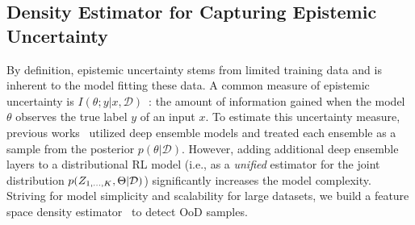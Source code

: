 \documentclass{article}
\newcommand{\datapoint}{x}
\newcommand{\state}{s}
\newcommand{\action}{a}
\newcommand{\agentIndex}{k}
\newcommand{\dataset}{\mathcal{D}}
\begin{document}



\vspace{-0.05in}
\subsection{Density Estimator for Capturing Epistemic Uncertainty}\label{subsec:epistemic-uncertainty}
\vspace{-0.05in}
By definition, epistemic uncertainty stems from limited training data and is inherent to the model fitting these data. A common measure of epistemic uncertainty is $I(\theta; y|\datapoint,\dataset)$~\cite{Smith2018Uncertainty,Amersfoort2020Uncertainty,Mukhoti2021Uncertainty}: the amount of information gained when the model $\theta$ observes the true label $y$ of an input $\datapoint$.
To estimate this uncertainty measure, previous works~\cite{Lakshminarayanan2017Ensembles,Wen2020BatchEnsemble,Dusenberry2020Bayesian} utilized deep ensemble models and treated each ensemble as a sample from the posterior $p(\theta|\dataset)$. However, adding additional deep ensemble layers to a distributional RL model (i.e., as a {\it unified} estimator for the joint distribution $p(Z_{1,\dots,\MakeUppercase{\agentIndex}},\Theta|\dataset)$) significantly increases the model complexity. Striving for model simplicity and scalability for large datasets,  we build a feature space density estimator~\cite{Mukhoti2021Uncertainty} to detect OoD samples. 
\end{document}

